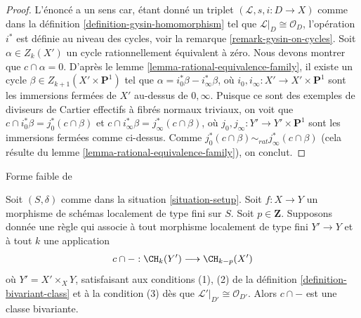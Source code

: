 \begin{proof}
L'énoncé a un sens car, étant donné un triplet
$(\mathcal{L}, s, i : D \to X)$ comme dans la
définition \ref{definition-gysin-homomorphism}
tel que $\mathcal{L}|_D \cong \mathcal{O}_D$, l'opération
$i^*$ est définie au niveau des cycles, voir la
remarque \ref{remark-gysin-on-cycles}.
Soit $\alpha \in Z_k(X')$ un cycle rationnellement équivalent à zéro.
Nous devons montrer que $c \cap \alpha = 0$. D'après le
lemme \ref{lemma-rational-equivalence-family},
il existe un cycle $\beta \in Z_{k + 1}(X' \times \mathbf{P}^1)$
tel que $\alpha = i_0^*\beta - i_\infty^*\beta$,
où $i_0, i_\infty : X' \to X' \times \mathbf{P}^1$ sont les
immersions fermées de $X'$ au-dessus de $0, \infty$. Puisque ce sont
des exemples de diviseurs de Cartier effectifs à fibrés normaux
triviaux, on voit que $c \cap i_0^*\beta = j_0^*(c \cap \beta)$
et $c \cap i_\infty^*\beta = j_\infty^*(c \cap \beta)$,
où $j_0, j_\infty : Y' \to Y' \times \mathbf{P}^1$ sont les
immersions fermées comme ci-dessus. Comme
$j_0^*(c \cap \beta) \sim_{rat} j_\infty^*(c \cap \beta)$
(cela résulte du lemme \ref{lemma-rational-equivalence-family}), on conclut.
\end{proof}

\begin{lemma}
\label{lemma-bivariant-weaker}
\begin{reference}
Forme faible de \cite[Théorème 17.1]{F}
\end{reference}
Soit $(S, \delta)$ comme dans la situation \ref{situation-setup}.
Soit $f : X \to Y$ un morphisme de schémas localement de type fini sur $S$.
Soit $p \in \mathbf{Z}$. Supposons donnée une règle
qui associe à tout morphisme localement de type fini $Y' \to Y$
et à tout $k$ une application
$$
c \cap - : \CH_k(Y') \longrightarrow \CH_{k - p}(X')
$$
où $Y' = X' \times_X Y$, satisfaisant aux conditions (1), (2) de la
définition \ref{definition-bivariant-class}
et à la condition (3) dès que $\mathcal{L}'|_{D'} \cong \mathcal{O}_{D'}$. Alors
$c \cap -$ est une classe bivariante.
\end{lemma}

